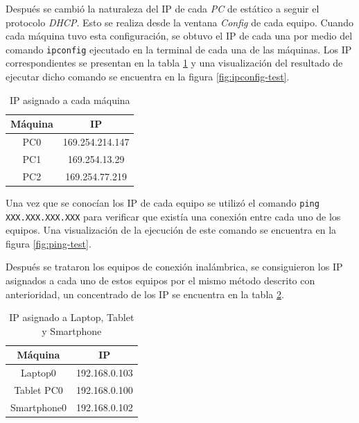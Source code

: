 \documentclass{article}
\begin{document}
        Después se cambió la naturaleza del IP de cada \emph{PC} de estático a seguir el protocolo \emph{DHCP}. Esto se realiza desde la ventana \emph{Config} de cada equipo. Cuando cada máquina tuvo esta configuración, se obtuvo el IP de cada una por medio del comando \lstinline{ipconfig} ejecutado en la terminal de cada una de las máquinas. Los IP correspondientes se presentan en la tabla \ref{table:pc-ips} y una visualización del resultado de ejecutar dicho comando se encuentra en la figura \ref{fig:ipconfig-test}.

        \begin{table}[h!]
            \centering
            \begin{tabular}{ ||c|c|| }
                \hline
                Máquina & IP \\[0.5ex]
                \hline \hline
                PC0 & 169.254.214.147 \\
                \hline
                PC1 & 169.254.13.29 \\
                \hline
                PC2 & 169.254.77.219 \\
                \hline
            \end{tabular}
            \caption{IP asignado a cada máquina}
            \label{table:pc-ips}
        \end{table}

        Una vez que se conocían los IP de cada equipo se utilizó el comando \lstinline{ping XXX.XXX.XXX.XXX} para verificar que existía una conexión entre cada uno de los equipos. Una visualización de la ejecución de este comando se encuentra en la figura \ref{fig:ping-test}.

        Después se trataron los equipos de conexión inalámbrica, se consiguieron los IP asignados a cada uno de estos equipos por el mismo método descrito con anterioridad, un concentrado de los IP se encuentra en la tabla \ref{table:wireless-ips}.

        \begin{table}[h!]
            \centering
            \begin{tabular}{ ||c|c|| }
            \hline
            Máquina & IP \\[0.5ex]
            \hline \hline
            Laptop0 & 192.168.0.103 \\
            \hline
            Tablet PC0 & 192.168.0.100 \\
            \hline
            Smartphone0 & 192.168.0.102 \\
            \hline
            \end{tabular}
            \caption{IP asignado a Laptop, Tablet y Smartphone}
            \label{table:wireless-ips}
        \end{table}
        
\end{document}
